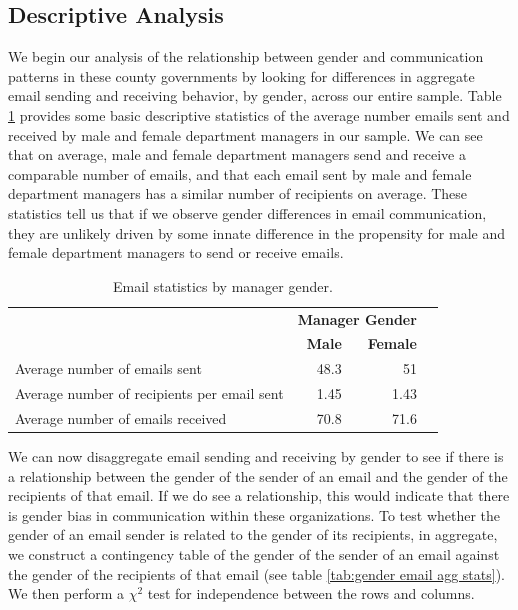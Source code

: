 \documentclass{pnastwo}
\begin{document}
\begin{article}
\section{Descriptive Analysis}

We begin our analysis of the relationship between gender and communication patterns in these county governments by looking for differences in aggregate email sending and receiving behavior, by gender, across our entire sample. Table \ref{tab:email agg stats} provides some basic descriptive statistics of the average number emails sent and received by male and female department managers in our sample. We can see that on average, male and female department managers send and receive a comparable number of emails, and that each email sent by male and female department managers has a similar number of recipients on average. These statistics tell us that if we observe gender differences in email communication, they are unlikely driven by some innate difference in the propensity for male and female department managers to send or receive emails. 
	
	
	\begin{table}
	\centering
		\begin{tabular}{m{2in}rrr}
		\toprule
		& \multicolumn{2}{c}{\textbf{Manager Gender}} \\
		\cmidrule{2-3}
	& \textbf{Male} & \textbf{Female}  \\
		 \midrule
		 Average number of emails sent & 48.3 & 51 \\
		 Average number of recipients per email sent & 1.45 & 1.43 \\
		 \midrule
		 Average number of emails received & 70.8 & 71.6 \\
		\bottomrule
		\end{tabular}
		\caption{\label{tab:email agg stats}Email statistics by manager
gender.\\}
	\end{table}
	
We can now disaggregate email sending and receiving by gender to see if there is a relationship between the gender of the sender of an email and the gender of the recipients of that email. If we do see a relationship, this would indicate that there is gender bias in communication within these organizations. To test whether the gender of an email sender is related to the gender of its recipients, in aggregate, we construct a contingency table of the gender of the sender of an email against the gender of the recipients of that email (see table \ref{tab:gender email agg stats}). We then perform a $\chi^2$ test for independence between the rows and columns.
	

\end{article}
\end{document}
